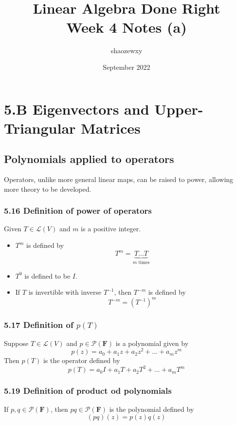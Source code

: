 \documentclass{article}
\title{Linear Algebra Done Right\\
\large{Week 4 Notes (a)}}
\author{shaozewxy }
\date{September 2022}
\begin{document}
\maketitle

\setcounter{secnumdepth}{0}
\section*{5.B Eigenvectors and Upper-Triangular Matrices}
\subsection*{Polynomials applied to operators}
Operators, unlike more general linear maps, can be raised to power, allowing more theory to be developed.
\subsubsection*{5.16 Definition of power of operators}
Given $T \in \mathcal{L}(V)$ and $m$ is a positive integer.
\begin{itemize}
    \item $T^m$ is defined by
    \begin{equation*}
        T^m = \underbrace{T...T}_{m \textrm{ times}}
    \end{equation*}
    \item $T^0$ is defined to be $I$.
    \item If $T$ is invertible with inverse $T^{-1}$, then $T^{-m}$ is defined by
    \begin{equation*}
        T^{-m} = (T^{-1})^m
    \end{equation*}
\end{itemize}
\subsubsection*{5.17 Definition of $p(T)$}
Suppose $T \in \mathcal{L}(V)$ and $p \in \mathcal{P}(\mathbf{F})$ is a polynomial given by
\begin{equation*}
    p(z) = a_0 + a_1z + a_2z^2 + ... + a_mz^m
\end{equation*}
Then $p(T)$ is the operator defined by
\begin{equation*}
    p(T) = a_0I + a_1T + a_2T^2 + ... + a_mT^m
\end{equation*}
\subsubsection*{5.19 Definition of product od polynomials}
If $p, q \in \mathcal{P}(\mathbf{F})$, then $pq \in \mathcal{P}(\mathbf{F})$ is the polynomial defined by
\begin{equation*}
    (pq)(z) = p(z)q(z)
\end{equation*}
\end{document}

